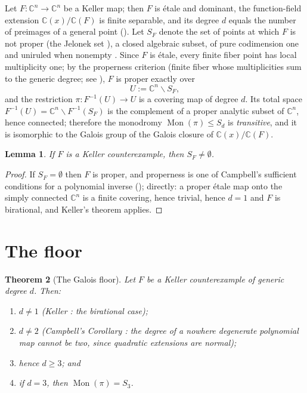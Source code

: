 \documentclass[11pt,reqno]{amsart}
\numberwithin{equation}{section}
\newtheorem{theorem}{Theorem}[section]
\newtheorem{lemma}[theorem]{Lemma}
\theoremstyle{remark}
\newcommand{\C}{\mathbb C}
\DeclareMathOperator{\Mon}{Mon}
\newcommand{\SF}{S_F}
\begin{document}
Let $F\colon\C^n\to\C^n$ be a Keller map; then $F$ is \'etale and dominant,
the function-field extension $\C(x)/\C(F)$ is finite separable, and its
degree $d$ equals the number of preimages of a general point
(\cite[Introduction]{Campbell}). Let $\SF$ denote the set of points at
which $F$ is not proper (the Jelonek set \cite{Jelonek}), a closed
algebraic subset, of pure codimension one and uniruled when nonempty
\cite{Jelonek}. Since $F$ is \'etale, every finite fiber point has local
multiplicity one; by the properness criterion (finite fiber whose
multiplicities sum to the generic degree; see \cite{Jelonek}), $F$ is
proper exactly over
\[
U:=\C^n\smallsetminus \SF ,
\]
and the restriction $\pi\colon F^{-1}(U)\to U$ is a covering map of degree
$d$. Its total space $F^{-1}(U)=\C^n\smallsetminus F^{-1}(\SF)$ is the
complement of a proper analytic subset of $\C^n$, hence connected;
therefore the monodromy $\Mon(\pi)\le S_d$ is \emph{transitive}, and it is
isomorphic to the Galois group of the Galois closure of $\C(x)/\C(F)$.

\begin{lemma}\label{lem:horizon}
If $F$ is a Keller counterexample, then $\SF\neq\emptyset$.
\end{lemma}

\begin{proof}
If $\SF=\emptyset$ then $F$ is proper, and properness is one of Campbell's
sufficient conditions for a polynomial inverse
(\cite[Introduction, condition 2]{Campbell}); directly: a proper \'etale
map onto the simply connected $\C^n$ is a finite covering, hence trivial,
hence $d=1$ and $F$ is birational, and Keller's theorem \cite{Keller}
applies.
\end{proof}

\section{The floor}\label{sec:floor}

\begin{theorem}[The Galois floor]\label{thm:floor}
Let $F$ be a Keller counterexample of generic degree $d$. Then:
\begin{enumerate}[label=\textup{(\roman*)}]
\item $d\neq1$ \textup{(}Keller \cite{Keller}: the birational case\textup{)};
\item $d\neq2$ \textup{(}Campbell's Corollary \cite[p.~248]{Campbell}: the
degree of a nowhere degenerate polynomial map cannot be two, since
quadratic extensions are normal\textup{)};
\item hence $d\ge3$; and
\item if $d=3$, then $\Mon(\pi)=S_3$.
\end{enumerate}
\end{theorem}
\end{document}
